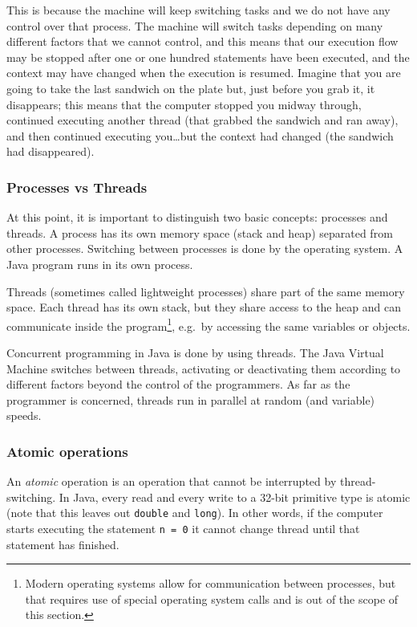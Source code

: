 This is because the machine will keep switching tasks and we do not
have any control over that process. The machine will switch tasks
depending on many different factors that we cannot control, and this
means that our execution flow may be stopped after one or one hundred
statements have been executed, and the context may have changed when
the execution is resumed. Imagine that you are going to take the last
sandwich on the plate but, just before you grab it, it disappears;
this means that the computer stopped you midway through, continued
executing another thread (that grabbed the sandwich and ran away), and
then continued executing you\ldots but the context had changed (the
sandwich had disappeared). 

\subsubsection{Processes vs Threads}
\label{sec:processes-vs-threads}

At this point, it is important to distinguish two basic concepts:
processes and threads. A process has its own memory space (stack and
heap) separated from other processes. Switching between processes is
done by the operating system. A Java program runs in its own process. 

Threads (sometimes called lightweight processes) share part of the
same memory space. Each thread has its own stack, but they share
access to the heap and can communicate inside the
program\footnote{Modern operating systems allow for communication
  between processes, but that requires use of special operating system
  calls and is out of the scope of this section.}, e.g.~by accessing
the same variables or objects. 

Concurrent programming in Java is done by using threads. The Java
Virtual Machine switches between threads, activating or deactivating
them according to different factors beyond the control of the
programmers. As far as the programmer is concerned, threads run in
parallel at random (and variable) speeds. 

\subsubsection{Atomic operations}
\label{sec:atomic-operations}

An \emph{atomic} operation is an operation that cannot be interrupted
by thread-switching. In Java, every read and every write to a 32-bit
primitive type is atomic (note that this leaves out \verb+double+ and
\verb+long+). In other words, if the computer starts executing the
statement \verb+n = 0+ it cannot change thread until that statement
has finished.

